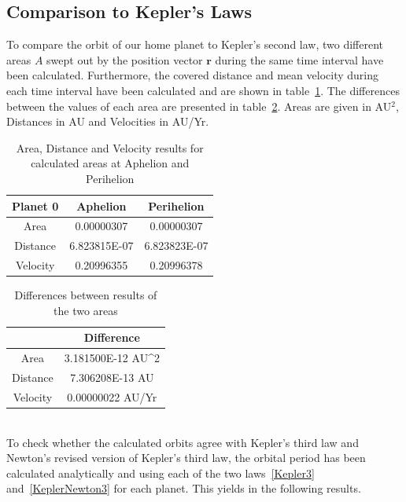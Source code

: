 \documentclass[reprint,english,notitlepage]{revtex4-2}
\begin{document}
\subsection{Comparison to Kepler's Laws}
	To compare the orbit of our home planet to Kepler's second law, two different areas $A$ swept out by the position vector $ \textbf{r}$ during the same time interval have been calculated.
	Furthermore, the covered distance and mean velocity during each time interval have been calculated and are shown in table~\ref{tab:Kepler2_table1}.
	The differences between the values of each area are presented in table~\ref{tab:Kepler2_table2}. Areas are given in AU$^2$, Distances in AU and Velocities in AU/Yr.
\begin{table}[h]
    \begin{tabular}{ |c|c|c| }
		\hline
        Planet 0 & Aphelion & Perihelion\\
        \hline
        Area & 0.00000307 & 0.00000307\\
        \hline
		Distance & 6.823815E-07 & 6.823823E-07\\
		\hline
		Velocity & 0.20996355 & 0.20996378\\
		\hline
    \end{tabular}
	\caption{Area, Distance and Velocity results for calculated areas at Aphelion and Perihelion}
	\label{tab:Kepler2_table1}
\end{table}

\begin{table}[h]
    \begin{tabular}{ |c|c| }
		\hline
		 & Difference\\
		\hline
		Area & 3.181500E-12 AU^2\\
		\hline
		Distance & 7.306208E-13 AU\\
		\hline
		Velocity & 0.00000022 AU/Yr\\
		\hline
	\end{tabular}
    \caption{Differences between results of the two areas}
    \label{tab:Kepler2_table2}
\end{table}\\

	To check whether the calculated orbits agree with Kepler's third law and Newton's revised version of Kepler's third law, the orbital period has been calculated analytically and using each of the two laws~\eqref{Kepler3} and~\eqref{KeplerNewton3} for each planet.
	This yields in the following results.\\
\end{document}
